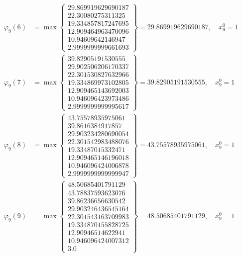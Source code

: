\documentclass{article}
\begin{document}
\begin{align*}
  
\varphi_{9}(6) &= \max \left\{ \begin{array}{c}
29.869919629690187 \\
 22.30080275311325 \\
 19.334857817247695 \\
 12.909464963470096 \\
 10.94609642146947 \\
 2.9999999999661693
\end{array} \right\} = 29.869919629690187, \quad x_{9}^0 = 1\\
  
  
  
  
\varphi_{9}(7) &= \max \left\{ \begin{array}{c}
39.82905191530555 \\
 29.902506206170337 \\
 22.301530827632966 \\
 19.334869973102805 \\
 12.909465143692003 \\
 10.946096423973486 \\
 2.9999999999995617
\end{array} \right\} = 39.82905191530555, \quad x_{9}^0 = 1\\
  
  
  
  
\varphi_{9}(8) &= \max \left\{ \begin{array}{c}
43.75578935975061 \\
 39.8616384917857 \\
 29.903234280690054 \\
 22.301542983488076 \\
 19.33487015332471 \\
 12.909465146196018 \\
 10.946096424006878 \\
 2.9999999999999947
\end{array} \right\} = 43.75578935975061, \quad x_{9}^0 = 1\\
  
  
  
  
\varphi_{9}(9) &= \max \left\{ \begin{array}{c}
48.50685401791129 \\
 43.78837593623076 \\
 39.86236656630542 \\
 29.903246436545164 \\
 22.301543163709983 \\
 19.334870155828725 \\
 12.90946514622941 \\
 10.946096424007312 \\
 3.0
\end{array} \right\} = 48.50685401791129, \quad x_{9}^0 = 1\\
  

\end{align*}
\end{document}
